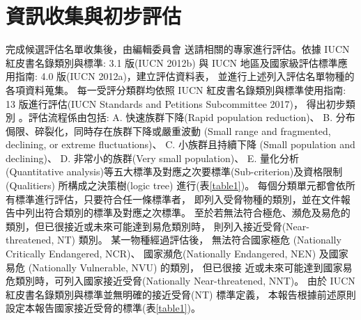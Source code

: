 \section{資訊收集與初步評估}
\begin{multicols}{2}
完成候選評估名單收集後，由編輯委員會
送請相關的專家進行評估。依據 IUCN 紅皮書名錄類別與標準: 3.1 版(IUCN 2012b) 與
IUCN 地區及國家級評估標準應用指南: 4.0 版(IUCN 2012a)，建立評估資料表，
並進行上述列入評估名單物種的各項資料蒐集。
每一受評分類群均依照 IUCN 紅皮書名錄類別與標準使用指南:
13 版進行評估(IUCN Standards and Petitions Subcommittee 2017)，
得出初步類別 。評估流程係由包括: A. 快速族群下降(Rapid population reduction)、
B. 分布侷限、碎裂化，同時存在族群下降或嚴重波動 (Small range and fragmented, declining, or extreme fluctuations)、
C. 小族群且持續下降 (Small population and declining)、
D. 非常小的族群(Very small population)、
E. 量化分析 (Quantitative analysis)等五大標準及對應之次要標準(Sub-criterion)及資格限制(Qualitiers)
所構成之決策樹(logic tree) 進行(表\ref{table1})。
每個分類單元都會依所有標準進行評估，只要符合任一條標準者，
即列入受脅物種的類別，並在文件報告中列出符合類別的標準及對應之次標準。
至於若無法符合極危、瀕危及易危的類別，但已很接近或未來可能達到易危類別時，
則列入接近受脅(Near-threatened, NT) 類別。 某一物種經過評估後，
無法符合國家極危 (Nationally Critically Endangered, NCR)、
國家瀕危(Nationally Endangered, NEN) 及國家易危 (Nationally Vulnerable, NVU) 的類別，
但已很接 近或未來可能達到國家易危類別時，可列入國家接近受脅(Nationally Near-threatened, NNT)。
由於 IUCN 紅皮書名錄類別與標準並無明確的接近受脅(NT) 標準定義，
本報告根據前述原則設定本報告國家接近受脅的標準(表\ref{table1})。\\
\end{multicols}
